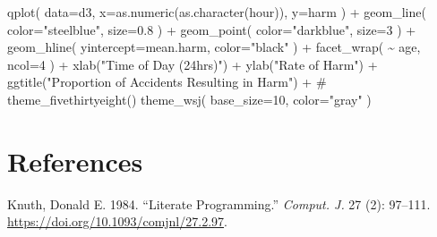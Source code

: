 \documentclass[
  letterpaper,
  DIV=11,
  numbers=noendperiod]{scrreprt}
\newenvironment{Shaded}{\begin{snugshade}}{\end{snugshade}}
\newcommand{\AttributeTok}[1]{\textcolor[rgb]{0.40,0.45,0.13}{#1}}
\newcommand{\CommentTok}[1]{\textcolor[rgb]{0.37,0.37,0.37}{#1}}
\newcommand{\DecValTok}[1]{\textcolor[rgb]{0.68,0.00,0.00}{#1}}
\newcommand{\FloatTok}[1]{\textcolor[rgb]{0.68,0.00,0.00}{#1}}
\newcommand{\FunctionTok}[1]{\textcolor[rgb]{0.28,0.35,0.67}{#1}}
\newcommand{\NormalTok}[1]{\textcolor[rgb]{0.00,0.23,0.31}{#1}}
\newcommand{\SpecialCharTok}[1]{\textcolor[rgb]{0.37,0.37,0.37}{#1}}
\newcommand{\StringTok}[1]{\textcolor[rgb]{0.13,0.47,0.30}{#1}}
\newlength{\cslhangindent}
\newlength{\cslentryspacingunit} %
\newenvironment{CSLReferences}[2] %
 {%
  \setlength{\parindent}{0pt}
  \ifodd #1
  \let\oldpar\par
  \def\par{\hangindent=\cslhangindent\oldpar}
  \fi
  \setlength{\parskip}{#2\cslentryspacingunit}
 }%
 {}
\begin{document}
\begin{Shaded}
\begin{Highlighting}[]
\FunctionTok{qplot}\NormalTok{( }\AttributeTok{data=}\NormalTok{d3, }\AttributeTok{x=}\FunctionTok{as.numeric}\NormalTok{(}\FunctionTok{as.character}\NormalTok{(hour)), }\AttributeTok{y=}\NormalTok{harm ) }\SpecialCharTok{+} 
  \FunctionTok{geom\_line}\NormalTok{( }\AttributeTok{color=}\StringTok{"steelblue"}\NormalTok{, }\AttributeTok{size=}\FloatTok{0.8}\NormalTok{ ) }\SpecialCharTok{+} 
  \FunctionTok{geom\_point}\NormalTok{( }\AttributeTok{color=}\StringTok{"darkblue"}\NormalTok{, }\AttributeTok{size=}\DecValTok{3}\NormalTok{ ) }\SpecialCharTok{+} 
  \FunctionTok{geom\_hline}\NormalTok{( }\AttributeTok{yintercept=}\NormalTok{mean.harm, }\AttributeTok{color=}\StringTok{"black"}\NormalTok{ ) }\SpecialCharTok{+} 
  \FunctionTok{facet\_wrap}\NormalTok{( }\SpecialCharTok{\textasciitilde{}}\NormalTok{ age, }\AttributeTok{ncol=}\DecValTok{4}\NormalTok{ ) }\SpecialCharTok{+} 
  \FunctionTok{xlab}\NormalTok{(}\StringTok{"Time of Day (24hrs)"}\NormalTok{) }\SpecialCharTok{+} \FunctionTok{ylab}\NormalTok{(}\StringTok{"Rate of Harm"}\NormalTok{) }\SpecialCharTok{+}
  \FunctionTok{ggtitle}\NormalTok{(}\StringTok{"Proportion of Accidents Resulting in Harm"}\NormalTok{) }\SpecialCharTok{+}
  \CommentTok{\# theme\_fivethirtyeight() }
  \FunctionTok{theme\_wsj}\NormalTok{( }\AttributeTok{base\_size=}\DecValTok{10}\NormalTok{, }\AttributeTok{color=}\StringTok{"gray"}\NormalTok{ )}
\end{Highlighting}
\end{Shaded}


\hypertarget{references}{%
\chapter*{References}\label{references}}


\hypertarget{refs}{}
\begin{CSLReferences}{1}{0}
\leavevmode{}%
Knuth, Donald E. 1984. {``Literate Programming.''} \emph{Comput. J.} 27
(2): 97--111. \url{https://doi.org/10.1093/comjnl/27.2.97}.

\end{CSLReferences}
\end{document}
